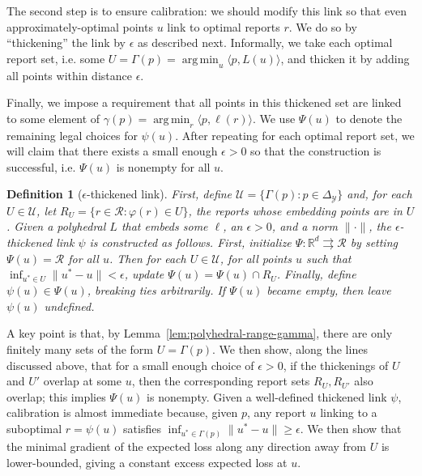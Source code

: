 \documentclass[11pt]{article}
\newcommand{\reals}{\mathbb{R}}
\newcommand{\simplex}{\Delta_\Y}
\newcommand{\R}{\mathcal{R}}
\newcommand{\U}{\mathcal{U}}
\newcommand{\Y}{\mathcal{Y}}
\newcommand{\inprod}[2]{\langle #1, #2 \rangle}%
\newcommand{\toto}{\rightrightarrows}
\DeclareMathOperator*{\argmin}{arg\,min}
\newtheorem{definition}{Definition}
\begin{document}

The second step is to ensure calibration: we should modify this link so that even approximately-optimal points $u$ link to optimal reports $r$.
We do so by ``thickening'' the link by $\epsilon$ as described next.
Informally, we take each optimal report set, i.e. some $U = \Gamma(p) = \argmin_u \inprod{p}{L(u)}$, and thicken it by adding all points within distance $\epsilon$.

Finally, we impose a requirement that all points in this thickened set are linked to some element of $\gamma(p) = \argmin_r \inprod{p}{\ell(r)}$.
We use $\Psi(u)$ to denote the remaining legal choices for $\psi(u)$.
After repeating for each optimal report set, we will claim that there exists a small enough $\epsilon > 0$ so that the construction is successful, i.e. $\Psi(u)$ is nonempty for all $u$.

\begin{definition}[$\epsilon$-thickened link] \label{def:eps-thick-link}
  First, define $\U = \{\Gamma(p) : p \in \simplex\}$ and, for each $U \in \U$, let $R_U = \{r \in \R : \varphi(r) \in U\}$, the reports whose embedding points are in $U$.
  Given a polyhedral $L$ that embeds some $\ell$, an $\epsilon > 0$, and a norm $\|\cdot\|$, the \emph{$\epsilon$-thickened link} $\psi$ is constructed as follows.
  First, initialize $\Psi: \reals^d \toto \R$ by setting $\Psi(u) = \R$ for all $u$.
  Then for each $U \in \U$, for all points $u$ such that $\inf_{u^* \in U} \|u^*-u\| < \epsilon$, update $\Psi(u) = \Psi(u) \cap R_U$.
  Finally, define $\psi(u) \in \Psi(u)$, breaking ties arbitrarily.
  If $\Psi(u)$ became empty, then leave $\psi(u)$ undefined.
\end{definition}
A key point is that, by Lemma~\ref{lem:polyhedral-range-gamma}, there are only finitely many sets of the form $U = \Gamma(p)$.
We then show, along the lines discussed above, that for a small enough choice of $\epsilon > 0$, if the thickenings of $U$ and $U'$ overlap at some $u$, then the corresponding report sets $R_U, R_{U'}$ also overlap; this implies $\Psi(u)$ is nonempty.
Given a well-defined thickened link $\psi$, calibration is almost immediate because, given $p$, any report $u$ linking to a suboptimal $r = \psi(u)$ satisfies $\inf_{u^* \in \Gamma(p)} \|u^* - u\| \geq \epsilon$.
  We then show that the minimal gradient of the expected loss along any direction away from $U$ is lower-bounded, giving a constant excess expected loss at $u$.
\end{document}
